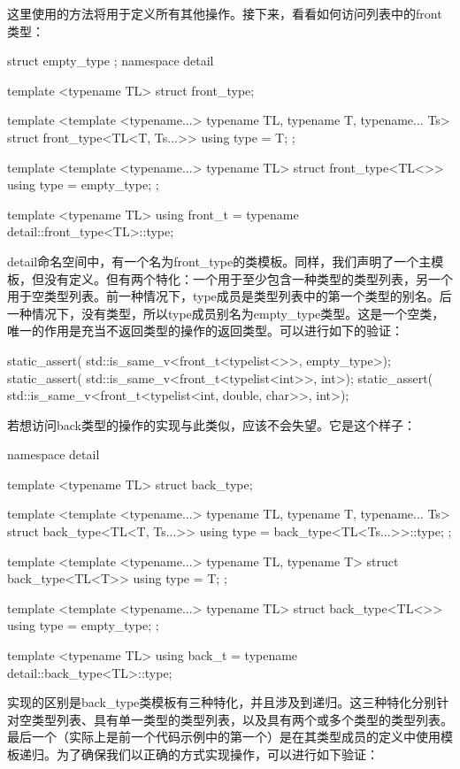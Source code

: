 这里使用的方法将用于定义所有其他操作。接下来，看看如何访问列表中的front类型：

\begin{cpp}
struct empty_type {};
namespace detail
{
	template <typename TL>
	struct front_type;
	
	template <template <typename...> typename TL,
			  typename T, typename... Ts>
	struct front_type<TL<T, Ts...>>
	{
		using type = T;
	};

	template <template <typename...> typename TL>
	struct front_type<TL<>>
	{
		using type = empty_type;
	};
}

template <typename TL>
using front_t = typename detail::front_type<TL>::type;
\end{cpp}

detail命名空间中，有一个名为front\_type的类模板。同样，我们声明了一个主模板，但没有定义。但有两个特化：一个用于至少包含一种类型的类型列表，另一个用于空类型列表。前一种情况下，type成员是类型列表中的第一个类型的别名。后一种情况下，没有类型，所以type成员别名为empty\_type类型。这是一个空类，唯一的作用是充当不返回类型的操作的返回类型。可以进行如下的验证：

\begin{cpp}
static_assert(
	std::is_same_v<front_t<typelist<>>, empty_type>);
static_assert(
	std::is_same_v<front_t<typelist<int>>, int>);
static_assert(
	std::is_same_v<front_t<typelist<int, double, char>>,
				   int>);
\end{cpp}

若想访问back类型的操作的实现与此类似，应该不会失望。它是这个样子：

\begin{cpp}
namespace detail
{
	template <typename TL>
	struct back_type;
	
	template <template <typename...> typename TL,
			  typename T, typename... Ts>
	struct back_type<TL<T, Ts...>>
	{
		using type = back_type<TL<Ts...>>::type;
	};

	template <template <typename...> typename TL,
	          typename T>
	struct back_type<TL<T>>
	{
		using type = T;
	};

	template <template <typename...> typename TL>
	struct back_type<TL<>>
	{
		using type = empty_type;
	};
}

template <typename TL>
using back_t = typename detail::back_type<TL>::type;
\end{cpp}

实现的区别是back\_type类模板有三种特化，并且涉及到递归。这三种特化分别针对空类型列表、具有单一类型的类型列表，以及具有两个或多个类型的类型列表。最后一个（实际上是前一个代码示例中的第一个）是在其类型成员的定义中使用模板递归。为了确保我们以正确的方式实现操作，可以进行如下验证：


